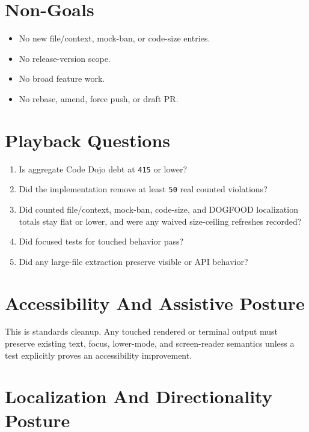 \section{Non-Goals}\label{record-241-non-goals}

\begin{itemize}
\tightlist
\item
  No new file/context, mock-ban, or code-size entries.
\item
  No release-version scope.
\item
  No broad feature work.
\item
  No rebase, amend, force push, or draft PR.
\end{itemize}

\section{Playback Questions}\label{record-241-playback-questions}

\begin{enumerate}
\def\labelenumi{\arabic{enumi}.}
\tightlist
\item
  Is aggregate Code Dojo debt at \texttt{4\allowbreak{}1\allowbreak{}5} or lower?
\item
  Did the implementation remove at least \texttt{5\allowbreak{}0} real counted violations?
\item
  Did counted file/context, mock-ban, code-size, and DOGFOOD localization totals stay flat or lower, and were any waived size-ceiling refreshes recorded?
\item
  Did focused tests for touched behavior pass?
\item
  Did any large-file extraction preserve visible or API behavior?
\end{enumerate}

\section{Accessibility And Assistive Posture}\label{record-241-accessibility-and-assistive-posture}

This is standards cleanup. Any touched rendered or terminal output must preserve existing text, focus, lower-mode, and screen-reader semantics unless a test explicitly proves an accessibility improvement.

\section{Localization And Directionality Posture}\label{record-241-localization-and-directionality-posture}

